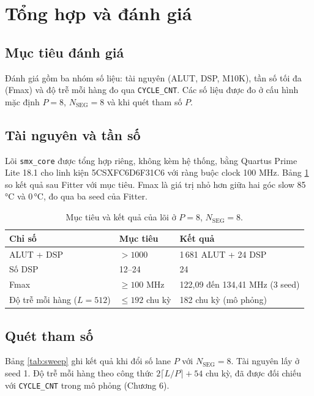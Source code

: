 \section{Tổng hợp và đánh giá}

\subsection{Mục tiêu đánh giá}

Đánh giá gồm ba nhóm số liệu: tài nguyên (ALUT, DSP, M10K), tần số tối đa (Fmax) và độ trễ mỗi hàng đo qua \texttt{CYCLE\_CNT}. Các số liệu được đo ở cấu hình mặc định $P = 8$, $N_{\text{SEG}} = 8$ và khi quét tham số $P$.

\subsection{Tài nguyên và tần số}

Lõi \texttt{smx\_core} được tổng hợp riêng, không kèm hệ thống, bằng Quartus Prime Lite 18.1 cho linh kiện 5CSXFC6D6F31C6 với ràng buộc clock 100 MHz. Bảng \ref{tab:synth} so kết quả sau Fitter với mục tiêu. Fmax là giá trị nhỏ hơn giữa hai góc slow 85\,°C và 0\,°C, đo qua ba seed của Fitter.

\begin{table}[htbp]
\centering
\begin{tabular}{lll}
\toprule
Chỉ số & Mục tiêu & Kết quả \\
\midrule
ALUT + DSP   & $> 1000$ & 1\,681 ALUT + 24 DSP \\
Số DSP       & 12--24   & 24 \\
Fmax         & $\ge 100$ MHz & 122,09 đến 134,41 MHz (3 seed) \\
Độ trễ mỗi hàng ($L = 512$) & $\le 192$ chu kỳ & 182 chu kỳ (mô phỏng) \\
\bottomrule
\end{tabular}
\caption{Mục tiêu và kết quả của lõi ở $P = 8$, $N_{\text{SEG}} = 8$.}
\label{tab:synth}
\end{table}

\subsection{Quét tham số}

Bảng \ref{tab:sweep} ghi kết quả khi đổi số lane $P$ với $N_{\text{SEG}} = 8$. Tài nguyên lấy ở seed 1. Độ trễ mỗi hàng theo công thức $2\lceil L/P \rceil + 54$ chu kỳ, đã được đối chiếu với \texttt{CYCLE\_CNT} trong mô phỏng (Chương 6).

